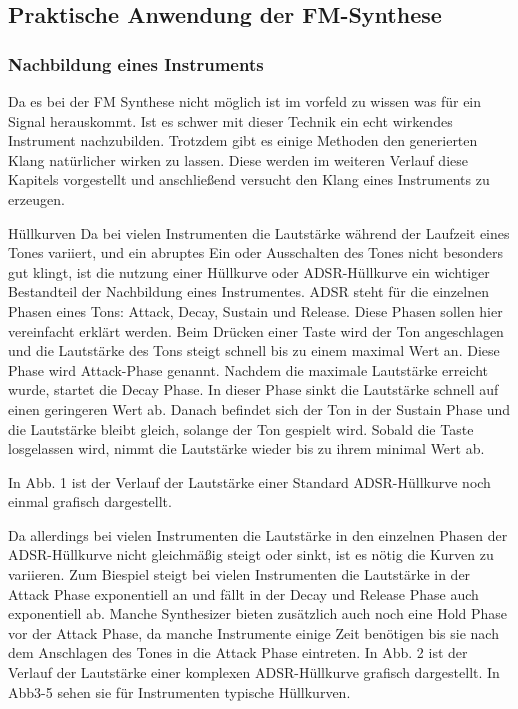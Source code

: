 \subsection{Praktische Anwendung der FM-Synthese}
\subsubsection{Nachbildung eines Instruments}
Da es bei der FM Synthese nicht möglich ist im vorfeld zu wissen was für ein Signal herauskommt. Ist es schwer mit dieser Technik ein echt wirkendes Instrument nachzubilden.
Trotzdem gibt es einige Methoden den generierten Klang natürlicher wirken zu lassen. Diese werden im weiteren Verlauf diese Kapitels vorgestellt und anschließend versucht den Klang eines Instruments zu erzeugen.

Hüllkurven
Da bei vielen Instrumenten die Lautstärke während der Laufzeit eines Tones variiert, und ein abruptes Ein oder Ausschalten des Tones nicht besonders gut klingt, ist die nutzung einer Hüllkurve oder ADSR-Hüllkurve ein wichtiger Bestandteil der Nachbildung eines Instrumentes. ADSR steht für die einzelnen Phasen eines Tons: Attack, Decay, Sustain und Release. Diese Phasen sollen hier vereinfacht erklärt werden. Beim Drücken einer Taste wird der Ton angeschlagen und die Lautstärke des Tons steigt schnell bis zu einem maximal Wert an. Diese Phase wird Attack-Phase genannt. Nachdem die maximale Lautstärke erreicht wurde, startet die Decay Phase. In dieser Phase sinkt die Lautstärke schnell auf einen geringeren Wert ab. Danach befindet sich der Ton in der Sustain Phase und die Lautstärke bleibt gleich, solange der Ton gespielt wird. Sobald die Taste losgelassen wird, nimmt die Lautstärke wieder bis zu ihrem minimal Wert ab. 

In Abb. 1 ist der Verlauf der Lautstärke einer Standard ADSR-Hüllkurve noch einmal grafisch dargestellt.

Da allerdings bei vielen Instrumenten die Lautstärke in den einzelnen Phasen der ADSR-Hüllkurve nicht gleichmäßig steigt oder sinkt, ist es nötig die Kurven zu variieren. Zum Biespiel steigt bei vielen Instrumenten die Lautstärke in der Attack Phase exponentiell an und fällt in der Decay und Release Phase auch exponentiell ab. Manche Synthesizer bieten zusätzlich auch noch eine Hold Phase vor der Attack Phase, da manche Instrumente einige Zeit benötigen bis sie nach dem Anschlagen des Tones in die Attack Phase eintreten.
In Abb. 2 ist der Verlauf der Lautstärke einer komplexen ADSR-Hüllkurve grafisch dargestellt. In Abb3-5 sehen sie für Instrumenten typische Hüllkurven.

